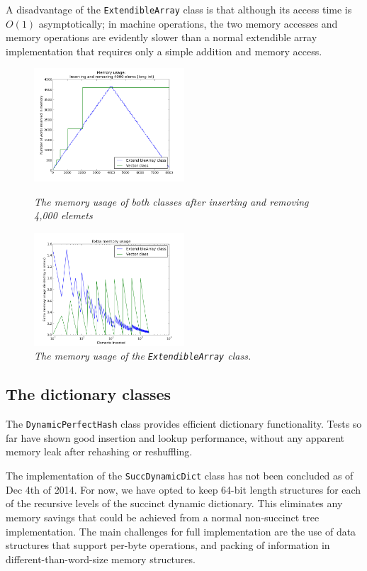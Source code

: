 \documentclass[10pt,a4paper]{article}
\begin{document}
A disadvantage of the \texttt{ExtendibleArray} class is that although its access time is
\(O(1)\) asymptotically; in machine operations, the two memory accesses and memory operations
are evidently slower than a normal extendible array implementation that requires only a 
simple addition and memory access.

\begin{figure}[h!]
\captionsetup{justification=centering}
  \centering
\centering
  \includegraphics[width=0.5\textwidth]{mem_usage_4k4k}
\caption{\emph{The memory usage of both classes after inserting and removing 4,000 elemets}}
\label{mem_usage_4k4k}
\centering
  \includegraphics[width=0.5\textwidth]{extra_mem_over_n_log}
\caption{\emph{The memory usage of the \texttt{ExtendibleArray} class.}}
\label{extra_mem_per_n}
\end{figure}

\subsection{The dictionary classes}
The \texttt{DynamicPerfectHash} class provides efficient dictionary functionality.
Tests so far have shown good insertion and lookup performance, without any apparent
memory leak after rehashing or reshuffling.

The implementation of the \texttt{SuccDynamicDict} class has not been concluded as of 
Dec 4th of 2014. For now, we have opted to keep 64-bit length structures for each of the
recursive levels of the succinct dynamic dictionary. This eliminates any memory savings
that could be achieved from a normal non-succinct tree implementation. 
The main challenges for full implementation are the use of data structures that support 
per-byte operations, and packing of information in different-than-word-size memory
structures.
\end{document}
